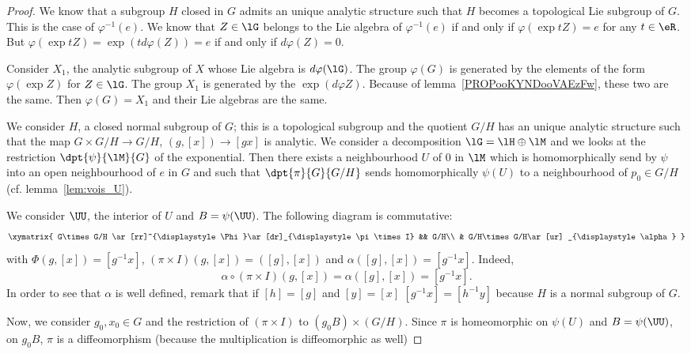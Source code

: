 \begin{proof}
	 We know that a subgroup $H$ closed in $G$ admits an unique analytic structure such that $H$ becomes a topological Lie subgroup of $G$. This is the case of $\varphi^{-1}(e)$. We know that $Z\in\lG$ belongs to the Lie algebra of $\varphi^{-1}(e)$ if and only if $\varphi(\exp tZ)=e$ for any $t\in\eR$. But $\varphi(\exp tZ)=\exp(td\varphi(Z))=e$ if and only if $d\varphi(Z)=0$.

	Consider $X_1$, the analytic subgroup of $X$ whose Lie algebra is $d\varphi(\lG)$. The group $\varphi(G)$ is generated by the elements of the form $\varphi(\exp Z)$ for $Z\in\lG$. The group $X_1$ is generated by the $\exp(d\varphi Z)$. Because of lemma~\ref{PROPooKYNDooVAEzFw}, these two are the same. Then $\varphi(G)=X_1$ and their Lie algebras are the same.

	We consider $H$, a closed normal subgroup of $G$; this is a topological subgroup and the quotient $G/H$ has an unique analytic structure such that the map $G\times G/H\to G/H$, $(g,[x])\to [gx]$ is analytic. We consider a decomposition $\lG=\lH\oplus\lM$ and we looks at the restriction $\dpt{\psi}{\lM}{G}$ of the exponential. Then there exists a neighbourhood $U$ of $0$ in $\lM$ which is homomorphically send by  $\psi$ into an open neighbourhood of $e$ in $G$ and such that $\dpt{\pi}{G}{G/H}$ sends homomorphically $\psi(U)$ to a neighbourhood  of $p_0\in G/H$ (cf. lemma~\ref{lem:vois_U}).

	We consider $\UU$, the interior of $U$ and $B=\psi(\UU)$. The following diagram is commutative:
	\begin{equation}
		\xymatrix{
			G\times G/H  \ar[rr]^{\displaystyle\Phi}\ar[dr]_{\displaystyle \pi\times I} &&  G/H\\
			&     G/H\times G/H\ar[ur] _{\displaystyle\alpha}
		}
	\end{equation}
	with $\Phi(g,[x])=[g^{-1} x]$, $(\pi\times I)(g,[x])=([g],[x])$ and $\alpha([g],[x])=[g^{-1} x]$. Indeed,
	\[
		\alpha\circ(\pi\times I)(g,[x])=\alpha([g],[x])=[g^{-1} x].
	\]
	In order to see that $\alpha$ is well defined, remark that if $[h]=[g]$ and $[y]=[x]$ $[g^{-1} x]=[h^{-1} y]$ because $H$ is a normal subgroup of $G$.

	Now, we consider $g_0,x_0\in G$ and the restriction of $(\pi\times I)$ to $(g_0B)\times(G/H)$. Since $\pi$ is homeomorphic on $\psi(U)$ and $B=\psi(\UU)$, on $g_0B$, $\pi$ is a diffeomorphism (because the multiplication is diffeomorphic as well)


\end{proof}
